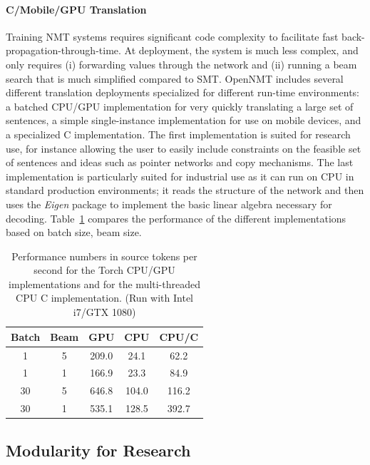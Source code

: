 \documentclass[11pt,a4paper]{article}
\begin{document}
\paragraph{C/Mobile/GPU Translation} Training NMT systems requires
significant code complexity to facilitate fast
back-propagation-through-time. At deployment, the system is much less
complex, and only requires (i) forwarding values through the network
and (ii) running a beam search that is much simplified compared to
SMT. OpenNMT includes several different translation deployments
specialized for different run-time environments: a batched CPU/GPU
implementation for very quickly translating a large set of sentences,
a simple single-instance implementation for use on mobile devices, and
a specialized C implementation. The first implementation is suited for
research use, for instance allowing the user to easily include
constraints on the feasible set of sentences and ideas such as pointer
networks and copy mechanisms. The last implementation is particularly
suited for industrial use as it can run on CPU in standard production
environments; it reads the structure of the network and then uses the
\textit{Eigen} package to implement the basic linear algebra necessary
for decoding. Table~\ref{tab:cpu} compares the performance of the
different implementations based on batch size, beam size.


\begin{table}
  \centering
  \begin{tabular}{ccccc}
    \toprule
    Batch & Beam & GPU & CPU & CPU/C \\ 
    \midrule
    1  & 5 & 209.0 & 24.1 & 62.2\\
    1  & 1 & 166.9 & 23.3 & 84.9\\
    30 & 5 & 646.8 & 104.0 & 116.2\\
    30 & 1 & 535.1 & 128.5  & 392.7\\

    \bottomrule
  \end{tabular}

  \label{tab:cpu}
  \caption{\small Performance numbers in source tokens per second for the Torch CPU/GPU implementations and for 
  the  multi-threaded CPU C implementation. (Run with Intel i7/GTX 1080)}
\end{table}

\subsection{Modularity for Research}
\end{document}
